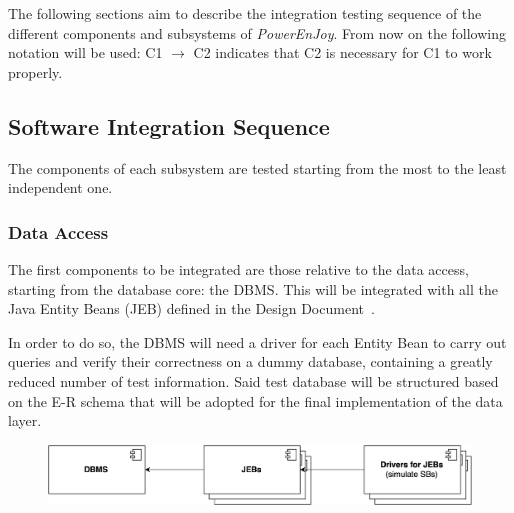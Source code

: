 The following sections aim to describe the integration testing sequence of the different components and subsystems of \emph{PowerEnJoy}. From now on the following notation will be used: C1 $\rightarrow$ C2 indicates that C2 is necessary for C1 to work properly.

\subsection{Software Integration Sequence}
The components of each subsystem are tested starting from the most to the least independent one.

\subsubsection{Data Access}
The first components to be integrated are those relative to the data access, starting from the database core: the DBMS. This will be integrated with all the Java Entity Beans (JEB) defined in the Design Document~\cite{dd}. 


In order to do so, the DBMS will need a driver for each Entity Bean to carry out queries and verify their correctness on a dummy database, containing a greatly reduced number of test information. Said test database will be structured based on the E-R schema that will be adopted for the final implementation of the data layer.


\begin{figure}[H]
\begin{center}
		\includegraphics[width=\textwidth]{./integration_strategy/diagrams/data_access.png}
\end{center}
\end{figure}

